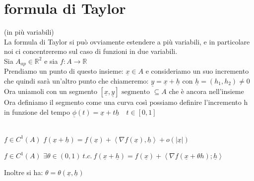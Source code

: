 \documentclass[a4paper, oneside]{article}
\begin{document}
\section{formula di Taylor}(in più variabili)\\
    La formula di Taylor si può ovviamente estendere a più variabili, e in particolare noi ci concentreremo sul caso di funzioni in due variabili.\\
        Sia $A_{ap} \in \mathbb{R}^2$ e sia $f:A\to \mathbb{R}$\\
        Prendiamo un punto di questo insieme: $\underline{x} \in A$ e consideriamo un suo incremento che quindi sarà un'altro punto che chiameremo: $\underline{y} = \underline{x} + \underline{h}$ con $\underline{h} = (h_1,h_2) \neq 0$\\
        Ora uniamoli con un segmento $[\underline{x}, \underline{y}] \text{ segmento } \subseteq A$ che è ancora nell'insieme\\
        Ora definiamo il segmento come una curva così possiamo definire l'incremento h in funzione del tempo $\underline{\phi}(t) = \underline{x} + t \underline{h} \quad t \in [0,1]$\\
        \hfill\\
        \begin{theorem}
             $f \in C^1(A)$  $f(\underline{x}+\underline{h}) = f(\underline{x}) + \left\langle \nabla f(\underline{x}), \underline{h}\right\rangle  + o(|\underline{x}|)$
        \end{theorem}


        \begin{theorem}
             $f \in C^1(A)$  $\exists\theta \in (0,1) \ t.c. \ f(\underline{x} + \underline{h}) = f(\underline{x}) + \left\langle \nabla f(\underline{x} + \theta h); \underline{h}\right\rangle $
        \end{theorem}

        \begin{observation}
            Inoltre si ha: $\theta = \theta(\underline{x}, \underline{h})$
        \end{observation}
\end{document}
